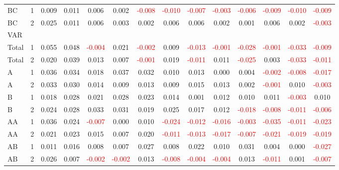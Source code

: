 \begin{table}[H]
{\begin{tabular}{llcccccccccccc}
BC & 1 & 0.009 & 0.011 & 0.006 & 0.002 & \textcolor{red}{-0.008} & \textcolor{red}{-0.010} & \textcolor{red}{-0.007} & \textcolor{red}{-0.003} & \textcolor{red}{-0.006} & \textcolor{red}{-0.009} & \textcolor{red}{-0.010} & \textcolor{red}{-0.009}\\
BC & 2 & 0.025 & 0.011 & 0.006 & 0.003 & 0.002 & 0.006 & 0.006 & 0.002 & 0.001 & 0.006 & 0.002 & \textcolor{red}{-0.003}\\
\hline
VAR &  &  &  &  &  &  &  &  &  &  &  &  & \\
\hline
Total & 1 & 0.055 & 0.048 & \textcolor{red}{-0.004} & 0.021 & \textcolor{red}{-0.002} & 0.009 & \textcolor{red}{-0.013} & \textcolor{red}{-0.001} & \textcolor{red}{-0.028} & \textcolor{red}{-0.001} & \textcolor{red}{-0.033} & \textcolor{red}{-0.009}\\
Total & 2 & 0.020 & 0.039 & 0.013 & 0.007 & \textcolor{red}{-0.001} & 0.019 & \textcolor{red}{-0.011} & 0.011 & \textcolor{red}{-0.025} & 0.003 & \textcolor{red}{-0.033} & \textcolor{red}{-0.011}\\
A & 1 & 0.036 & 0.034 & 0.018 & 0.037 & 0.032 & 0.010 & 0.013 & 0.000 & 0.004 & \textcolor{red}{-0.002} & \textcolor{red}{-0.008} & \textcolor{red}{-0.017}\\
A & 2 & 0.033 & 0.030 & 0.014 & 0.009 & 0.013 & 0.009 & 0.015 & 0.013 & 0.002 & \textcolor{red}{-0.001} & 0.010 & \textcolor{red}{-0.003}\\
B & 1 & 0.018 & 0.028 & 0.021 & 0.028 & 0.023 & 0.014 & 0.001 & 0.012 & 0.010 & 0.011 & \textcolor{red}{-0.003} & 0.010\\
B & 2 & 0.024 & 0.028 & 0.033 & 0.031 & 0.019 & 0.025 & 0.017 & 0.012 & \textcolor{red}{-0.018} & \textcolor{red}{-0.008} & \textcolor{red}{-0.011} & \textcolor{red}{-0.006}\\
AA & 1 & 0.036 & 0.024 & \textcolor{red}{-0.007} & 0.000 & 0.010 & \textcolor{red}{-0.024} & \textcolor{red}{-0.012} & \textcolor{red}{-0.016} & \textcolor{red}{-0.003} & \textcolor{red}{-0.035} & \textcolor{red}{-0.011} & \textcolor{red}{-0.023}\\
AA & 2 & 0.021 & 0.023 & 0.015 & 0.007 & 0.020 & \textcolor{red}{-0.011} & \textcolor{red}{-0.013} & \textcolor{red}{-0.017} & \textcolor{red}{-0.007} & \textcolor{red}{-0.021} & \textcolor{red}{-0.019} & \textcolor{red}{-0.019}\\
AB & 1 & 0.011 & 0.016 & 0.008 & 0.007 & 0.027 & 0.008 & 0.022 & 0.010 & 0.031 & 0.004 & 0.000 & \textcolor{red}{-0.027}\\
AB & 2 & 0.026 & 0.007 & \textcolor{red}{-0.002} & \textcolor{red}{-0.002} & 0.013 & \textcolor{red}{-0.008} & \textcolor{red}{-0.004} & \textcolor{red}{-0.004} & 0.013 & \textcolor{red}{-0.011} & 0.001 & \textcolor{red}{-0.007}\\

\end{tabular}}
\end{table}
